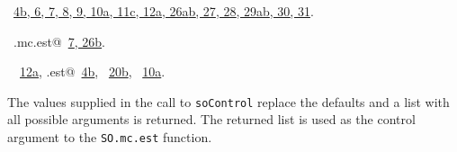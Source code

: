 \documentclass[reqno]{amsart}
\renewcommand{\NWlink}[2]{\hyperlink{#1}{#2}}
\begin{document}
\begin{flushleft}
\begin{list}{}{\setlength{\itemsep}{-\parsep}\setlength{\itemindent}{-\leftmargin}}
\item \NWtxtFileDefBy\ \NWlink{nuweb4b}{4b}\NWlink{nuweb6}{, 6}\NWlink{nuweb7}{, 7}\NWlink{nuweb8}{, 8}\NWlink{nuweb9}{, 9}\NWlink{nuweb10a}{, 10a}\NWlink{nuweb11c}{, 11c}\NWlink{nuweb12a}{, 12a}\NWlink{nuweb26a}{, 26a}\NWlink{nuweb26b}{b}\NWlink{nuweb27}{, 27}\NWlink{nuweb28}{, 28}\NWlink{nuweb29a}{, 29a}\NWlink{nuweb29b}{b}\NWlink{nuweb30}{, 30}\NWlink{nuweb31}{, 31}.
\item \NWtxtIdentsDefed\nobreak\  \verb@SO.mc.est@\nobreak\ \NWlink{nuweb7}{7}\NWlink{nuweb26b}{, 26b}.\item \NWtxtIdentsUsed\nobreak\  \verb@DownUpMatrix@\nobreak\ \NWlink{nuweb12a}{12a}, \verb@mc.est@\nobreak\ \NWlink{nuweb4b}{4b}, \verb@ReprodISDM@\nobreak\ \NWlink{nuweb20b}{20b}, \verb@soControl@\nobreak\ \NWlink{nuweb10a}{10a}.
\item{}
\end{list}
\vspace{4ex}
\end{flushleft}
The values supplied in the call to \texttt{soControl} replace the defaults and 
a list with all possible arguments is returned. The returned list is used as 
the control argument to the \texttt{SO.mc.est} function.
\end{document}
